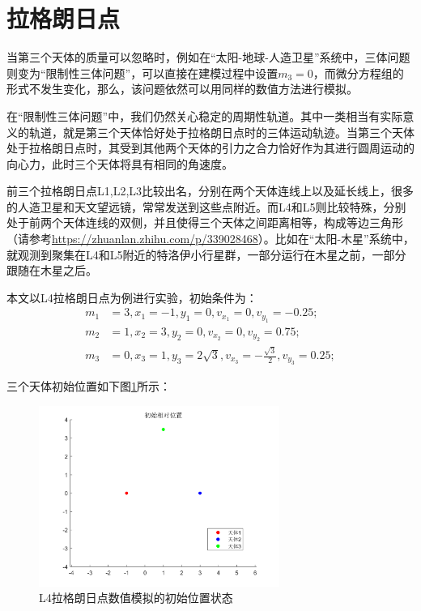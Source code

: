 \documentclass{article}
\begin{document}
\section{拉格朗日点}
\par 当第三个天体的质量可以忽略时，例如在“太阳-地球-人造卫星”系统中，三体问题则变为“限制性三体问题”，可以直接在建模过程中设置$m_3=0$，而微分方程组的形式不发生变化，那么，该问题依然可以用同样的数值方法进行模拟。
\par 在“限制性三体问题”中，我们仍然关心稳定的周期性轨道。其中一类相当有实际意义的轨道，就是第三个天体恰好处于拉格朗日点时的三体运动轨迹。当第三个天体处于拉格朗日点时，其受到其他两个天体的引力之合力恰好作为其进行圆周运动的向心力，此时三个天体将具有相同的角速度。
\par 前三个拉格朗日点L1,L2,L3比较出名，分别在两个天体连线上以及延长线上，很多的人造卫星和天文望远镜，常常发送到这些点附近。而L4和L5则比较特殊，分别处于前两个天体连线的双侧，并且使得三个天体之间距离相等，构成等边三角形（请参考\url{https://zhuanlan.zhihu.com/p/339028468}）。比如在“太阳-木星”系统中，就观测到聚集在L4和L5附近的特洛伊小行星群，一部分运行在木星之前，一部分跟随在木星之后。
\par 本文以L4拉格朗日点为例进行实验，初始条件为：
\begin{align*}
	m_1&=3,x_1= -1 ,y_1= 0,v_{x_1}= 0, v_{y_1}= -0.25;\\
	m_2&=1,x_2= 3 ,y_2= 0,	v_{x_2}= 0 ,v_{y_2}= 0.75;\\
	m_3&=0,x_3= 1 ,y_3=2 \sqrt{3},v_{x_3}= -\frac{\sqrt{3}}{2}, v_{y_3}=0.25;
\end{align*}
\par 三个天体初始位置如下图\ref{Lagrange_init}所示：
\begin{figure}[H]
	\centering  %
	\includegraphics[width=0.7\textwidth]{拉格朗日点L4//拉格朗日点 初始状态}
	\caption{L4拉格朗日点数值模拟的初始位置状态}
	\label{Lagrange_init}
\end{figure}
\end{document}
